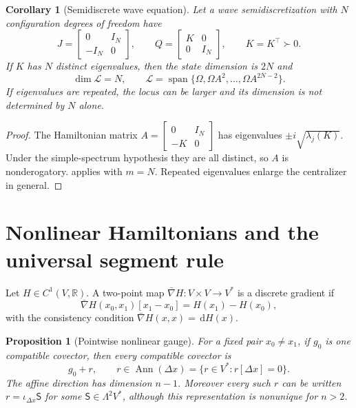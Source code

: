 \documentclass[11pt,a4paper]{article}
\newtheorem{proposition}[theorem]{Proposition}
\newtheorem{corollary}[theorem]{Corollary}
\newcommand{\R}{\mathbb R}
\newcommand{\cL}{\mathcal L}
\newcommand{\dd}{\,\mathrm d}
\newcommand{\Span}{\operatorname{span}}
\begin{document}
\begin{corollary}[Semidiscrete wave equation]\label{cor:wave-locus}
Let a wave semidiscretization with \(N\) configuration degrees of freedom
have
\[
 J=\begin{bmatrix}0&I_N\\-I_N&0\end{bmatrix},
 \qquad
 Q=\begin{bmatrix}K&0\\0&I_N\end{bmatrix},
 \qquad K=K^\top\succ0.
\]
If \(K\) has \(N\) distinct eigenvalues, then the state dimension is
\(2N\) and
\[
 \dim\cL=N,\qquad
 \cL=\Span\{\Omega,\Omega A^2,\ldots,\Omega A^{2N-2}\}.
\]
If eigenvalues are repeated, the locus can be larger and its dimension is
not determined by \(N\) alone.
\end{corollary}

\begin{proof}
The Hamiltonian matrix
\(A=\left[\begin{smallmatrix}0&I_N\\-K&0\end{smallmatrix}\right]\)
has eigenvalues \(\pm i\sqrt{\lambda_j(K)}\). Under the simple-spectrum
hypothesis they are all distinct, so \(A\) is nonderogatory.
 applies with \(m=N\). Repeated eigenvalues
enlarge the centralizer in general.
\end{proof}

\section{Nonlinear Hamiltonians and the universal segment rule}

Let \(H\in C^1(V,\R)\). A two-point map
\(\bar\nabla H:V\times V\to V^*\) is a discrete gradient if
\begin{equation}\label{eq:dg}
 \bar\nabla H(x_0,x_1)[x_1-x_0]=H(x_1)-H(x_0),
\end{equation}
with the consistency condition
\(\bar\nabla H(x,x)=\dd H(x)\).

\begin{proposition}[Pointwise nonlinear gauge]\label{prop:nonlinear-gauge}
For a fixed pair \(x_0\ne x_1\), if \(g_0\) is one compatible covector,
then every compatible covector is
\[
 g_0+r,\qquad r\in\operatorname{Ann}(\Delta x)
 =\{r\in V^*:r[\Delta x]=0\}.
\]
The affine direction has dimension \(n-1\). Moreover every such \(r\)
can be written \(r=\iota_{\Delta x}\mathsf S\) for some
\(\mathsf S\in\Lambda^2V^*\), although this representation is nonunique
for \(n>2\).
\end{proposition}
\end{document}
